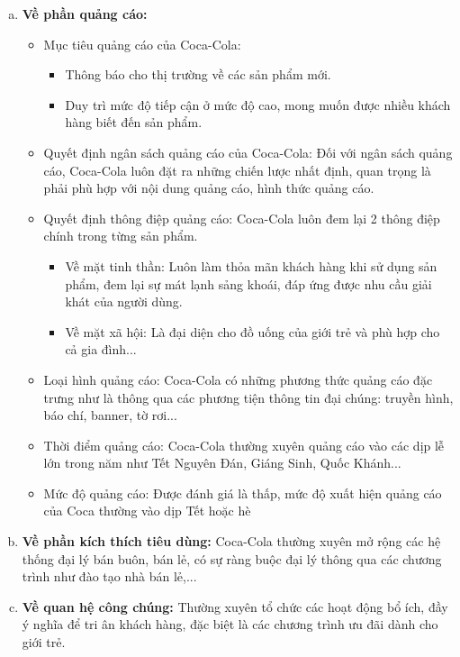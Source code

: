 \documentclass{article}
\begin{document}
\begin{itemize}
        \begin{enumerate}[a.]
            \item \textbf{Về phần quảng cáo:}
            \begin{itemize}
                \item Mục tiêu quảng cáo của Coca-Cola:
                \begin{itemize}
                    \item Thông báo cho thị trường về các sản phẩm mới.
                    \item Duy trì mức độ tiếp cận ở mức độ cao, mong muốn được nhiều khách hàng biết đến sản phẩm.
                \end{itemize}
                \item Quyết định ngân sách quảng cáo của Coca-Cola: Đối với ngân sách quảng cáo, Coca-Cola luôn đặt ra những chiến lược nhất định, quan trọng là phải phù hợp với nội dung quảng cáo, hình thức quảng cáo.
                \item Quyết định thông điệp quảng cáo: Coca-Cola luôn đem lại 2 thông điệp chính trong từng sản phẩm.
                \begin{itemize}
                    \item Về mặt tinh thần: Luôn làm thỏa mãn khách hàng khi sử dụng sản phẩm, đem lại sự mát lạnh sảng khoái, đáp ứng được nhu cầu giải khát của người dùng.
                    \item Về mặt xã hội: Là đại diện cho đồ uống của giới trẻ và phù hợp cho cả gia đình...
                \end{itemize}
                \item Loại hình quảng cáo: Coca-Cola có những phương thức quảng cáo đặc trưng như là thông qua các phương tiện thông tin đại chúng: truyền hình, báo chí, banner, tờ rơi...
                \item Thời điểm quảng cáo: Coca-Cola thường xuyên quảng cáo vào các dịp lễ lớn trong năm như Tết Nguyên Đán, Giáng Sinh, Quốc Khánh...
                \item Mức độ quảng cáo: Được đánh giá là thấp, mức độ xuất hiện quảng cáo của Coca thường vào dịp Tết hoặc hè
            \end{itemize}
            \item \textbf{Về phần kích thích tiêu dùng:} Coca-Cola thường xuyên mở rộng các hệ thống đại lý bán buôn, bán lẻ, có sự ràng buộc đại lý thông qua các chương trình như đào tạo nhà bán lẻ,...
            \item \textbf{Về quan hệ công chúng:} Thường xuyên tổ chức các hoạt động bổ ích, đầy ý nghĩa để tri ân khách hàng, đặc biệt là các chương trình ưu đãi dành cho giới trẻ. 
        \end{enumerate}
    \end{itemize}
    
\end{document}
